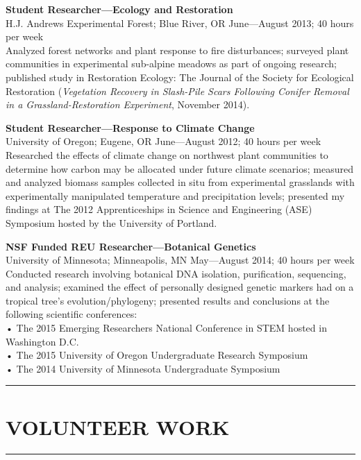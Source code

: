 \documentclass[a4paper]{article}
\begin{document}
\medskip

\textbf{Student Researcher—Ecology and Restoration}\\
\textcolor[RGB]{128,128,128}{H.J. Andrews Experimental Forest; Blue River, OR \hfill June—August 2013; 40 hours per week}\\
Analyzed forest networks and plant response to fire disturbances; surveyed plant communities in experimental sub-alpine meadows as part of ongoing research; published study in Restoration Ecology: The Journal of the Society for Ecological Restoration (\textit{Vegetation Recovery in Slash-Pile Scars Following Conifer Removal in a Grassland-Restoration Experiment}, November 2014).

\medskip

\textbf{Student Researcher—Response to Climate Change}\\
\textcolor[RGB]{128,128,128}{University of Oregon; Eugene, OR \hfill June—August 2012; 40 hours per week}\\
Researched the effects of climate change on northwest plant communities to determine how carbon may be allocated under future climate scenarios; measured and analyzed biomass samples collected in situ from experimental grasslands with experimentally manipulated temperature and precipitation levels; presented my findings at The 2012 Apprenticeships in Science and Engineering (ASE) Symposium hosted by the University of Portland.

\medskip

\textbf{NSF Funded REU Researcher—Botanical Genetics}\\
\textcolor[RGB]{128,128,128}{University of Minnesota; Minneapolis, MN \hfill  May—August 2014; 40 hours per week}\\
Conducted research involving botanical DNA isolation, purification, sequencing, and analysis; examined the effect of personally designed genetic markers had on a tropical tree's evolution/phylogeny; presented results and conclusions at the following scientific conferences:\\ 
• The 2015 Emerging Researchers National Conference in STEM hosted in Washington D.C.\\
• The 2015 University of Oregon Undergraduate Research Symposium\\
• The 2014 University of Minnesota Undergraduate Symposium\\

\noindent\rule{\textwidth}{1pt}\vspace{-1.5em}
\section*{VOLUNTEER WORK}\vspace{-1.5em}
\textcolor[RGB]{128,128,128}{\rule{\linewidth}{1pt}}
\end{document}
